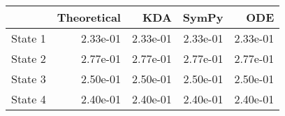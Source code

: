 \begin{tabular}{lrrrr}
\toprule
{} &  Theoretical &      KDA &    SymPy &      ODE \\
\midrule
State 1 &     2.33e-01 & 2.33e-01 & 2.33e-01 & 2.33e-01 \\
State 2 &     2.77e-01 & 2.77e-01 & 2.77e-01 & 2.77e-01 \\
State 3 &     2.50e-01 & 2.50e-01 & 2.50e-01 & 2.50e-01 \\
State 4 &     2.40e-01 & 2.40e-01 & 2.40e-01 & 2.40e-01 \\
\bottomrule
\end{tabular}
